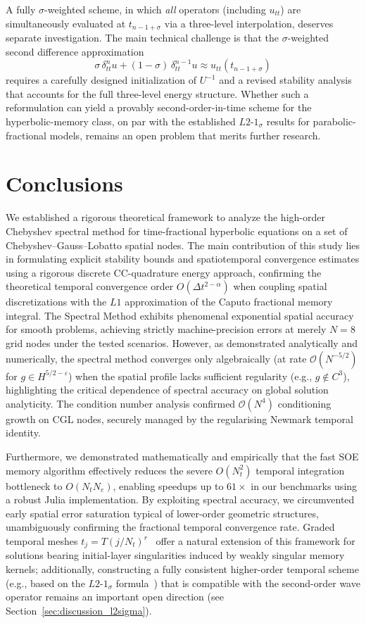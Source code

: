\documentclass[a4paper,fleqn]{cas-sc}
\begin{document}
A fully $\sigma$-weighted scheme, in which \emph{all} operators (including $u_{tt}$) are simultaneously evaluated at $t_{n-1+\sigma}$ via a three-level interpolation, deserves separate investigation. The main technical challenge is that the $\sigma$-weighted second difference approximation
\[
  \sigma\,\delta_{tt}^n u + (1-\sigma)\,\delta_{tt}^{n-1} u \approx u_{tt}(t_{n-1+\sigma})
\]
requires a carefully designed initialization of $U^{-1}$ and a revised stability analysis that accounts for the full three-level energy structure. Whether such a reformulation can yield a provably second-order-in-time scheme for the hyperbolic-memory class, on par with the established $L2$-$1_\sigma$ results for parabolic-fractional models, remains an open problem that merits further research.

\section{Conclusions}\label{sec:conclusion}
We established a rigorous theoretical framework to analyze the high-order Chebyshev spectral method for time-fractional hyperbolic equations on a set of Chebyshev--Gauss--Lobatto spatial nodes. The main contribution of this study lies in formulating explicit stability bounds and spatiotemporal convergence estimates using a rigorous discrete CC-quadrature energy approach, confirming the theoretical temporal convergence order $O(\Delta t^{2-\alpha})$ when coupling spatial discretizations with the $L1$ approximation of the Caputo fractional memory integral. The Spectral Method exhibits phenomenal exponential spatial accuracy for smooth problems, achieving strictly machine-precision errors at merely $N=8$ grid nodes under the tested scenarios. However, as demonstrated analytically and numerically, the spectral method converges only algebraically (at rate $\mathcal{O}(N^{-5/2})$ for $g \in H^{5/2-\varepsilon}$) when the spatial profile lacks sufficient regularity (e.g., $g \notin C^3$), highlighting the critical dependence of spectral accuracy on global solution analyticity. The condition number analysis confirmed $\mathcal{O}(N^4)$ conditioning growth on CGL nodes, securely managed by the regularising Newmark temporal identity.

Furthermore, we demonstrated mathematically and empirically that the fast SOE memory algorithm effectively reduces the severe $O(N_t^2)$ temporal integration bottleneck to $O(N_t N_e)$, enabling speedups up to $61\times$ in our benchmarks using a robust Julia implementation. By exploiting spectral accuracy, we circumvented early spatial error saturation typical of lower-order geometric structures, unambiguously confirming the fractional temporal convergence rate. Graded temporal meshes $t_j = T(j/N_t)^r$~\cite{stynes2017,liao2018sharp} offer a natural extension of this framework for solutions bearing initial-layer singularities induced by weakly singular memory kernels; additionally, constructing a fully consistent higher-order temporal scheme (e.g., based on the $L2$-$1_\sigma$ formula~\cite{ref21}) that is compatible with the second-order wave operator remains an important open direction (see Section~\ref{sec:discussion_l2sigma}).
\end{document}
